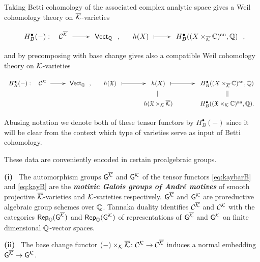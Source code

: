\documentclass[twoside,leqno]{article}
\numberwithin{equation}{section}
\theoremstyle{plain}
\theoremstyle{definition}
\begin{document}
Taking Betti cohomology of the associated complex analytic space gives
a Weil cohomology theory on $\overline{\mathcal K}$-varieties \cite{stacksproject}
\begin{equation} \label{eq:kaybarB}
\xymatrix@1@M+0.5pc{
  H^{\bullet}_{B}(-) \,\colon \hspace{-2.4pc} &
  \CA{\kaybar}  \ar[r] &  \mathsf{Vect}_{\bbQ}}, \quad
\xymatrix@1@M+0.5pc{h(X) \ar@{|->}[r] & 
H^{\bullet}_{B}((X\times_{\kaybar}\bbC)^{\op{an}},\bbQ)},
\end{equation}
and by precomposing with base change gives also a compatible Weil
cohomology theory on $\mathcal K$-varieties
\begin{equation} \label{eq:kayB}
  \xymatrix@1@M+0.5pc{
    H^{\bullet}_{B}(-) \,\colon \hspace{-2.4pc} &
    \CA{\kay}  \ar[r] & \mathsf{Vect}_{\bbQ}}, \quad
  \xymatrix@R-3pc@M+0.5pc@C+0.2pc{
    h(\mathfrak{X}) \ar@{|->}[r] &  h(X) \ar@{|->}[r] &
    H^{\bullet}_{B}((X\times_{\kaybar}\bbC)^{\op{an}},\bbQ) \\
    & || & || \\
    & h(\mathfrak{X}\times_{\kay} \kaybar) &
    H^{\bullet}_{B}((\mathfrak{X}\times_{\kay}\bbC)^{\op{an}},\bbQ).
    }
\end{equation}
Abusing notation we denote both of these tensor functors by
$H^{\bullet}_{B}(-)$ since it will be clear from the context which
type of varieties serve as input of Betti cohomology. 

These data are conveniently encoded in  certain proalgebraic groups.  

\medskip

\noindent
{\bfseries (i)} \ The automorphism groups $\mathsf{G}^{\overline{\mathcal K}}$ and
$\mathsf{G}^{\mathcal K}$ of the tensor functors \eqref{eq:kaybarB} and
\eqref{eq:kayB} are the \emph{\bfseries motivic Galois groups of
  Andr\'{e} motives} of smooth projective $\overline{\mathcal K}$-varieties and
$\mathcal K$-varieties respectively.  $\mathsf{G}^{\overline{\mathcal K}}$ and $\mathsf{G}^{\mathcal K}$ are
proreductive algebraic group schemes over $\mathbb Q$. Tannaka duality
identifies $\mathcal{C}^{\overline{\mathcal K}}$ and $\mathcal{C}^{\mathcal K}$ with the categories
$\mathsf{Rep}_{\mathbb Q}(\mathsf{G}^{\overline{\mathcal K}})$ and
$\mathsf{Rep}_{\mathbb Q}(\mathsf{G}^{\mathcal K})$ of representations of $\mathsf{G}^{\overline{\mathcal K}}$
and $\mathsf{G}^{\mathcal K}$ on finite dimensional $\mathbb Q$-vector spaces.

\medskip

\noindent
{\bfseries (ii)} \ The base change functor $(-)\times_{\mathcal K} \overline{\mathcal K} \colon
\mathcal{C}^{\mathcal K} \to \mathcal{C}^{\overline{\mathcal K}}$ induces a normal embedding
$\mathsf{G}^{\overline{\mathcal K}} \to \mathsf{G}^{\mathcal K}$.
\end{document}
